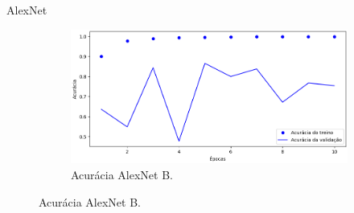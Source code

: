 \begin{frame}{AlexNet}
\begin{figure}[h!]
\begin{subfigure}{0.3\linewidth}
    \end{subfigure}
    \hspace{1.5cm}
    \begin{subfigure}{0.3\linewidth}
      \caption{Acurácia AlexNet B.\label{subfig:alexnet-b-acc}}
      \includegraphics[width=\linewidth]{img/alexnet-b-acc}%
    \end{subfigure}
    \label{fig:treinamento-alexnet}
  \end{figure}
\end{frame}

